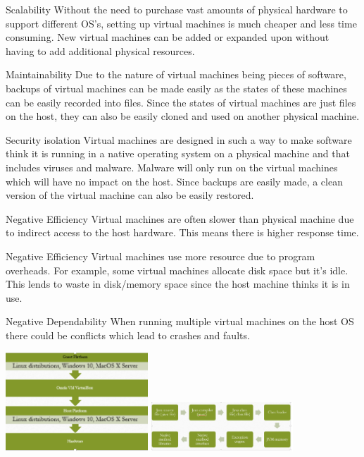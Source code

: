 \begin{nfps}
\item[Scalability] Without the need to purchase vast amounts of physical
    hardware to support different OS's, setting up virtual machines is much
    cheaper and less time consuming. New virtual machines can be added or
    expanded upon without having to add additional physical resources.

\item[Maintainability] Due to the nature of virtual machines being pieces of
    software, backups of virtual machines can be made easily as the states of
    these machines can be easily recorded into files. Since the states of
    virtual machines are just files on the host, they can also be easily cloned
    and used on another physical machine.

\item[Security isolation] Virtual machines are designed in such a way to make
    software think it is running in a native operating system on a physical
    machine and that includes viruses and malware. Malware will only run on the
    virtual machines which will have no impact on the host. Since
    backups are easily made, a clean version of the virtual machine can also be
    easily restored.

\item[Negative Efficiency] Virtual machines are often slower than physical
    machine due to indirect access to the host hardware. This means there is
    higher response time.

\item[Negative Efficiency] Virtual machines use more resource due to
    program overheads. For example, some virtual machines allocate disk space
    but it's idle. This lends to waste in disk/memory space since the host
    machine thinks it is in use.

\item[Negative Dependability] When running multiple virtual machines on the
    host OS there could be conflicts which lead to crashes and faults.
\end{nfps}

\begin{center}
    \includegraphics[width=0.4\textwidth]{./virtual-machine}
    \includegraphics[width=0.4\textwidth]{./virtual-machine2}
\end{center}
